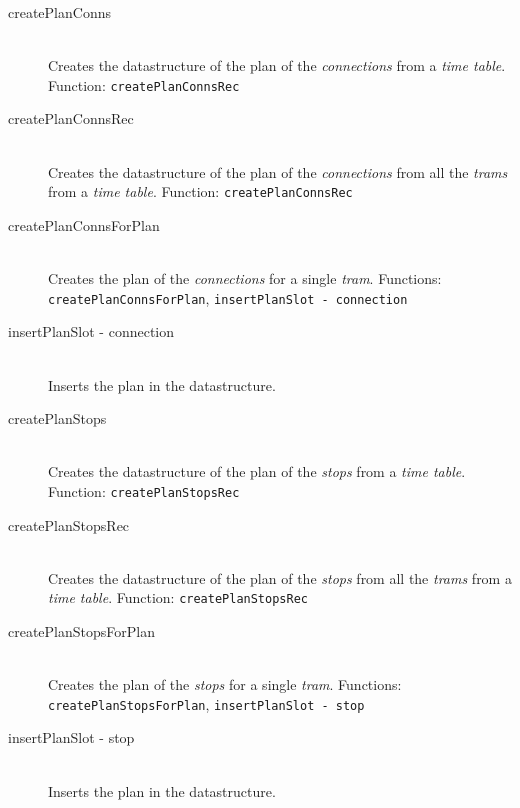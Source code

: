 \documentclass[a4]{article}
\begin{document}
\begin{description}
    \item[createPlanConns] \hfill \\ Creates the datastructure of the plan of the \emph{connections} from a \emph{time table}. Function: \verb=createPlanConnsRec=
    \item[createPlanConnsRec] \hfill \\ Creates the datastructure of the plan of the \emph{connections} from all the \emph{trams} from a \emph{time table}. Function: \verb=createPlanConnsRec=
    \item[createPlanConnsForPlan] \hfill \\ Creates the plan of the \emph{connections} for a single \emph{tram}. Functions: \verb=createPlanConnsForPlan=, \verb=insertPlanSlot - connection=
    \item[insertPlanSlot - connection] \hfill \\ Inserts the plan in the datastructure.
    \item[createPlanStops] \hfill \\ Creates the datastructure of the plan of the \emph{stops} from a \emph{time table}. Function: \verb=createPlanStopsRec=
    \item[createPlanStopsRec] \hfill \\ Creates the datastructure of the plan of the \emph{stops} from all the \emph{trams} from a \emph{time table}. Function: \verb=createPlanStopsRec=
    \item[createPlanStopsForPlan] \hfill \\ Creates the plan of the \emph{stops} for a single \emph{tram}. Functions: \verb=createPlanStopsForPlan=, \verb=insertPlanSlot - stop=
    \item[insertPlanSlot - stop] \hfill \\ Inserts the plan in the datastructure.
\end{description}
\end{document}
